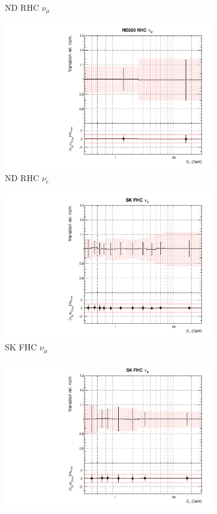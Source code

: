 \begin{figure}
\begin{subfigure}{0.24\textwidth}
  \caption{ND RHC $\nu_{\mu}$}
\end{subfigure}
\vspace{15mm}
\begin{subfigure}{0.24\textwidth}
  \centering
  \includegraphics[width=0.95\linewidth]{figs/asmvflux7}
  \caption{ND RHC $\nu_e$}
\end{subfigure}
\begin{subfigure}{0.24\textwidth}
  \centering
  \includegraphics[width=0.95\linewidth]{figs/asmvflux8}
  \caption{SK FHC $\nu_{\mu}$}
\end{subfigure}
\begin{subfigure}{0.24\textwidth}
  \centering
  \includegraphics[width=0.95\linewidth]{figs/asmvflux9}

\end{subfigure}
\end{figure}

